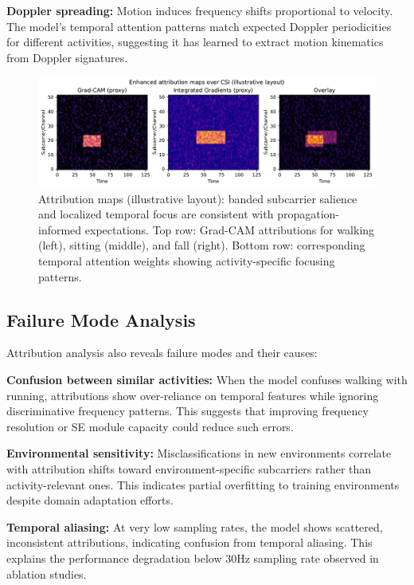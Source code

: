 \documentclass[journal]{IEEEtran}
\begin{document}
\textbf{Doppler spreading:} Motion induces frequency shifts proportional to velocity. The model's temporal attention patterns match expected Doppler periodicities for different activities, suggesting it has learned to extract motion kinematics from Doppler signatures.

\begin{figure}[t]
\centering
\includegraphics[width=\columnwidth]{plots/attribution_examples.pdf}
\caption{Attribution maps (illustrative layout): banded subcarrier salience and localized temporal focus are consistent with propagation-informed expectations. Top row: Grad-CAM attributions for walking (left), sitting (middle), and fall (right). Bottom row: corresponding temporal attention weights showing activity-specific focusing patterns.}
\label{fig:attribution}
\end{figure}

\subsection{Failure Mode Analysis}
Attribution analysis also reveals failure modes and their causes:

\textbf{Confusion between similar activities:} When the model confuses walking with running, attributions show over-reliance on temporal features while ignoring discriminative frequency patterns. This suggests that improving frequency resolution or SE module capacity could reduce such errors.

\textbf{Environmental sensitivity:} Misclassifications in new environments correlate with attribution shifts toward environment-specific subcarriers rather than activity-relevant ones. This indicates partial overfitting to training environments despite domain adaptation efforts.

\textbf{Temporal aliasing:} At very low sampling rates, the model shows scattered, inconsistent attributions, indicating confusion from temporal aliasing. This explains the performance degradation below 30Hz sampling rate observed in ablation studies.
\end{document}

